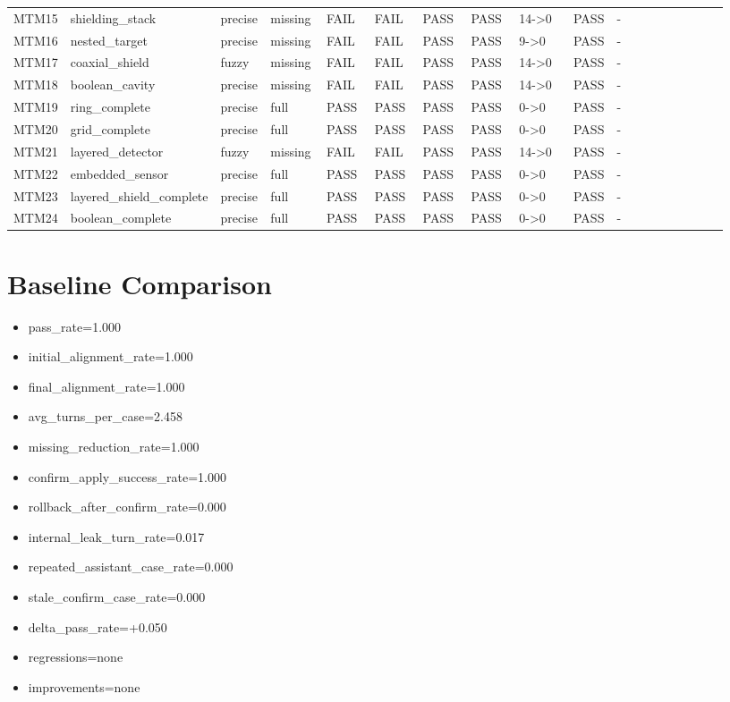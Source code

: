 \documentclass[11pt]{ctexart}
\begin{document}
\begin{longtable}{p{0.06\linewidth}p{0.08\linewidth}p{0.07\linewidth}p{0.08\linewidth}p{0.07\linewidth}p{0.07\linewidth}p{0.07\linewidth}p{0.07\linewidth}p{0.09\linewidth}p{0.06\linewidth}p{0.21\linewidth}}
MTM15 & shielding\_stack & precise & missing & FAIL & FAIL & PASS & PASS & 14->0 & PASS & - \\
MTM16 & nested\_target & precise & missing & FAIL & FAIL & PASS & PASS & 9->0 & PASS & - \\
MTM17 & coaxial\_shield & fuzzy & missing & FAIL & FAIL & PASS & PASS & 14->0 & PASS & - \\
MTM18 & boolean\_cavity & precise & missing & FAIL & FAIL & PASS & PASS & 14->0 & PASS & - \\
MTM19 & ring\_complete & precise & full & PASS & PASS & PASS & PASS & 0->0 & PASS & - \\
MTM20 & grid\_complete & precise & full & PASS & PASS & PASS & PASS & 0->0 & PASS & - \\
MTM21 & layered\_detector & fuzzy & missing & FAIL & FAIL & PASS & PASS & 14->0 & PASS & - \\
MTM22 & embedded\_sensor & precise & full & PASS & PASS & PASS & PASS & 0->0 & PASS & - \\
MTM23 & layered\_shield\_complete & precise & full & PASS & PASS & PASS & PASS & 0->0 & PASS & - \\
MTM24 & boolean\_complete & precise & full & PASS & PASS & PASS & PASS & 0->0 & PASS & - \\
\bottomrule
\end{longtable}
\section{Baseline Comparison}
\begin{itemize}
\item pass\_rate=1.000
\item initial\_alignment\_rate=1.000
\item final\_alignment\_rate=1.000
\item avg\_turns\_per\_case=2.458
\item missing\_reduction\_rate=1.000
\item confirm\_apply\_success\_rate=1.000
\item rollback\_after\_confirm\_rate=0.000
\item internal\_leak\_turn\_rate=0.017
\item repeated\_assistant\_case\_rate=0.000
\item stale\_confirm\_case\_rate=0.000
\item delta\_pass\_rate=+0.050
\item regressions=none
\item improvements=none
\end{itemize}
\appendix
\end{document}
